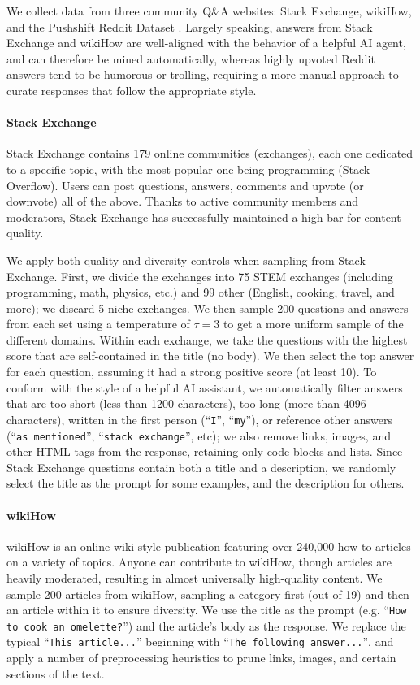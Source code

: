 \documentclass{article}
\begin{document}
We collect data from three community Q\&A websites: Stack Exchange, wikiHow, and the Pushshift Reddit Dataset \citep{baumgartner2020pushshift}.
Largely speaking, answers from Stack Exchange and wikiHow are well-aligned with the behavior of a helpful AI agent, and can therefore be mined automatically, whereas highly upvoted Reddit answers tend to be humorous or trolling, requiring a more manual approach to curate responses that follow the appropriate style.

\paragraph{Stack Exchange}
Stack Exchange contains 179 online communities (exchanges), each one dedicated to a specific topic, with the most popular one being programming (Stack Overflow).
Users can post questions, answers, comments and upvote (or downvote) all of the above.
Thanks to active community members and moderators, Stack Exchange has successfully maintained a high bar for content quality.

We apply both quality and diversity controls when sampling from Stack Exchange.
First, we divide the exchanges into 75 STEM exchanges (including programming, math, physics, etc.) and 99 other (English, cooking, travel, and more); we discard 5 niche exchanges.
We then sample 200 questions and answers from each set using a temperature of $\tau = 3$ to get a more uniform sample of the different domains.
Within each exchange, we take the questions with the highest score that are self-contained in the title (no body).
We then select the top answer for each question, assuming it had a strong positive score (at least 10).
To conform with the style of a helpful AI assistant, we automatically filter answers that are too short (less than 1200 characters), too long (more than 4096 characters), written in the first person (``\texttt{I}'', ``\texttt{my}''), or reference other answers (``\texttt{as mentioned}'', ``\texttt{stack exchange}'', etc);
we also remove links, images, and other HTML tags from the response, retaining only code blocks and lists.
Since Stack Exchange questions contain both a title and a description, we randomly select the title as the prompt for some examples, and the description for others.

\paragraph{wikiHow}
wikiHow is an online wiki-style publication featuring over 240,000 how-to articles on a variety of topics.
Anyone can contribute to wikiHow, though articles are heavily moderated, resulting in almost universally high-quality content.
We sample 200 articles from wikiHow, sampling a category first (out of 19) and then an article within it to ensure diversity.
We use the title as the prompt (e.g. ``\texttt{How to cook an omelette?}'') and the article's body as the response.
We replace the typical ``\texttt{This article...}'' beginning with ``\texttt{The following answer...}'', and apply a number of preprocessing heuristics to prune links, images, and certain sections of the text.
\end{document}
